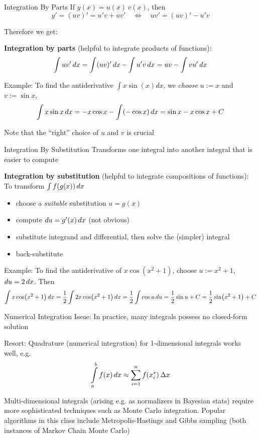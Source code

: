 \begin{frame}{Integration By Parts}
    If $y(x)=u(x)\,v(x)$, then
    $$y'=(uv)'=u'v+uv' \quad \Longleftrightarrow \quad uv'=(uv)'-u'v  $$

    Therefore we get:
    \begin{boxed}
        \textbf{Integration by parts} (helpful to integrate products of functions):
        $$\int u v' \mathop{dx} = \int (uv)' \mathop{dx} - \int u'v \mathop{dx} = u v  - \int v u'  \mathop{dx}$$
    \end{boxed}

    Example: To find the antiderivative $\int x\sin(x)dx$, we \emph{choose} $u := x$ and $v := \sin x$,
    $$\int x \sin x \mathop{dx} = -x \cos x - \int(-\cos x ) \mathop{dx}= \sin x - x \cos x +C$$

    Note that the ``right'' choice of $u$ and $v$ is crucial
\end{frame}

\begin{frame}{Integration By Substitution}
    Transforms one integral into another integral that is easier to compute

    \begin{boxed}
        \textbf{Integration by substitution} (helpful to integrate compositions of functions):\\
        To transform $\int f(g(x)) \mathop{dx}$
        \begin{itemize}
            \item choose a \emph{suitable} substitution $u = g(x)$
            \item compute $\mathop{du} = g'(x) \mathop{dx}$ \quad (not obvious)
            \item substitute integrand and differential, then solve the (simpler) integral
            \item back-substitute
        \end{itemize}
    \end{boxed}

    Example: To find the antiderivative of $x \cos(x^2+1)$, choose $u := x^2 + 1$, $\mathop{du} = 2 \mathop{dx}$. Then
    $$
        \int x \cos(x^2+1) \mathop{dx}
        = \frac{1}{2} \int 2x \cos(x^2+1) \mathop{dx}
        = \frac{1}{2} \int\cos u \mathop{du}
        = \frac{1}{2}\sin u + C
        = \frac{1}{2}\sin(x^2+1) + C
    $$
\end{frame}

\begin{frame}{Numerical Integration}
    Issue: In practice, many integrals possess no closed-form solution

    Resort: Quadrature (numerical integration) for 1-dimensional integrals works well, e.g.
    $$\int\limits_a^b f(x) \mathop{dx} \approx \sum_{i=1}^nf(x_i^*)\,\Delta x$$

    Multi-dimensional integrals (arising e.g. as normalizers in Bayesian stats) require more
    sophisticated techniques such as Monte Carlo integration. Popular algorithms in this class
    include Metropolis-Hastings and Gibbs sampling (both instances of
    Markov Chain Monte Carlo)
\end{frame}

